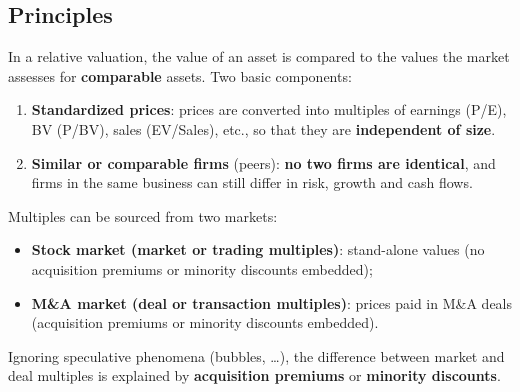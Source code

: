 \subsection{Principles}
In a relative valuation, the value of an asset is compared to the values the market assesses for \textbf{comparable} assets. Two basic components:
\begin{enumerate}
  \item \textbf{Standardized prices}: prices are converted into multiples of earnings (P/E), BV (P/BV), sales (EV/Sales), etc., so that they are \textbf{independent of size}.
  \item \textbf{Similar or comparable firms} (peers): \textbf{no two firms are identical}, and firms in the same business can still differ in risk, growth and cash flows.
\end{enumerate}
Multiples can be sourced from two markets:
\begin{itemize}
  \item \textbf{Stock market (market or trading multiples)}: stand-alone values (no acquisition premiums or minority discounts embedded);
  \item \textbf{M\&A market (deal or transaction multiples)}: prices paid in M\&A deals (acquisition premiums or minority discounts embedded).
\end{itemize}
\begin{keybox}
Ignoring speculative phenomena (bubbles, \dots), the difference between market and deal multiples is explained by \textbf{acquisition premiums} or \textbf{minority discounts}.
\end{keybox}

